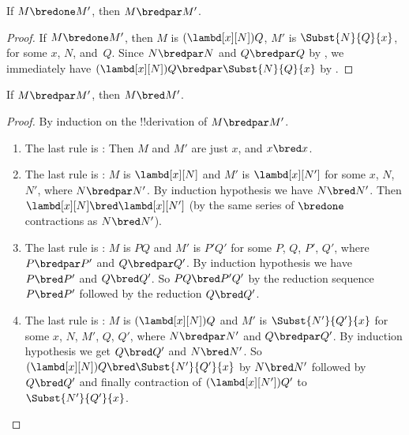 \documentclass[../../../include/open-logic-section]{subfiles}
\begin{document}


\begin{lem}
  If $M \bredone M'$, then $M \bredpar M'$.
\end{lem}
\begin{proof} If $M \bredone M'$, then $M$ is
    $(\lambd[x][N])Q$, $M'$ is $\Subst{N}{Q}{x}$, for some
    $x$, $N$, and~$Q$. Since $N \bredpar N$ and $Q \bredpar Q$ by
    , we immediately have $(\lambd[x][N])Q
    \bredpar \Subst{N}{Q}{x}$ by .
\end{proof}

\begin{lem}
  If $M \bredpar M'$, then $M \bred M'$.
\end{lem}

\begin{proof} By induction on the !!{derivation} of $M \bredpar M'$.
  \begin{enumerate}
  \item The last rule is : Then $M$ and $M'$
    are just $x$, and $x \bred x$.
  \item The last rule is : $M$ is 
    $\lambd[x][N]$ and $M'$ is $\lambd[x][N']$ for some $x$, $N$, $N'$, where
    $N \bredpar N'$. By induction hypothesis we have $N \bred N'$. Then
    $\lambd[x][N] \bred \lambd[x][N']$ (by the same series of
    $\bredone$ contractions as $N \bred N'$).
  \item The last rule is : $M$ is 
    $PQ$ and $M'$ is $P'Q'$ for some $P$, $Q$, $P'$, $Q'$, where $P \bredpar P'$
    and $Q \bredpar Q'$. By induction hypothesis we have $P \bred P'$ and $Q \bred
    Q'$.  So $PQ \bred P'Q'$ by the reduction sequence $P \bred P'$ followed
    by the reduction $Q \bred Q'$.
  \item The last rule is : $M$ is
    $(\lambd[x][N])Q$ and $M'$ is  $\Subst{N'}{Q'}{x}$ for some $x$,
    $N$, $M'$, $Q$, $Q'$, where $N \bredpar N'$ and $Q \bredpar Q'$.
    By induction hypothesis we get $Q \bred Q'$ and $N \bred N'$. So
    $(\lambd[x][N])Q \bred \Subst{N'}{Q'}{x}$ by $N \bred N'$ followed
    by $Q \bred Q'$ and finally contraction of $(\lambd[x][N'])Q'$ to
    $\Subst{N'}{Q'}{x}$.
  \end{enumerate}
\end{proof}
\end{document}
